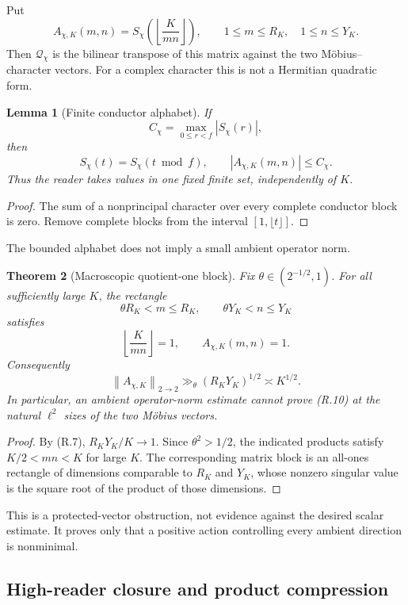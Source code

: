 \documentclass[11pt]{article}
\newtheorem{theorem}{Theorem}[section]
\newtheorem{lemma}[theorem]{Lemma}
\theoremstyle{definition}
\theoremstyle{remark}
\newcommand{\norm}[1]{\left\lVert#1\right\rVert}
\begin{document}
Put
\[
 A_{\chi,K}(m,n)
 =S_\chi\!\left(\left\lfloor\frac{K}{mn}\right\rfloor\right),
 \qquad
 1\le m\le R_K,
 \quad
 1\le n\le Y_K.
 \tag{R.11}
\]
Then $\mathcal Q_\chi$ is the bilinear transpose of this matrix against the
two M\"obius--character vectors.  For a complex character this is not a
Hermitian quadratic form.

\begin{lemma}[Finite conductor alphabet]
\label{lem:rectangular-finite-alphabet}
If
\[
 C_\chi=\max_{0\le r<f}|S_\chi(r)|,
\]
then
\[
 S_\chi(t)=S_\chi(t\bmod f),
 \qquad
 |A_{\chi,K}(m,n)|\le C_\chi.
 \tag{R.12}
\]
Thus the reader takes values in one fixed finite set, independently of $K$.
\end{lemma}

\begin{proof}
The sum of a nonprincipal character over every complete conductor block is
zero.  Remove complete blocks from the interval $[1,\lfloor t\rfloor]$.
\end{proof}

The bounded alphabet does not imply a small ambient operator norm.

\begin{theorem}[Macroscopic quotient-one block]
\label{thm:rectangular-ambient-obstruction}
Fix $\theta\in(2^{-1/2},1)$.  For all sufficiently large $K$, the rectangle
\[
 \theta R_K<m\le R_K,
 \qquad
 \theta Y_K<n\le Y_K
\]
satisfies
\[
 \left\lfloor\frac{K}{mn}\right\rfloor=1,
 \qquad A_{\chi,K}(m,n)=1.
\]
Consequently
\[
 \boxed{
 \norm{A_{\chi,K}}_{2\to2}
 \gg_\theta(R_KY_K)^{1/2}\asymp K^{1/2}.}
 \tag{R.13}
\]
In particular, an ambient operator-norm estimate cannot prove
\textup{(R.10)} at the natural $\ell^2$ sizes of the two M\"obius vectors.
\end{theorem}

\begin{proof}
By \textup{(R.7)}, $R_KY_K/K\to1$.  Since $\theta^2>1/2$, the indicated
products satisfy $K/2<mn<K$ for large $K$.  The corresponding matrix block is
an all-ones rectangle of dimensions comparable to $R_K$ and $Y_K$, whose
nonzero singular value is the square root of the product of those dimensions.
\end{proof}

This is a protected-vector obstruction, not evidence against the desired
scalar estimate.  It proves only that a positive action controlling every
ambient direction is nonminimal.

\subsection{High-reader closure and product compression}
\end{document}
